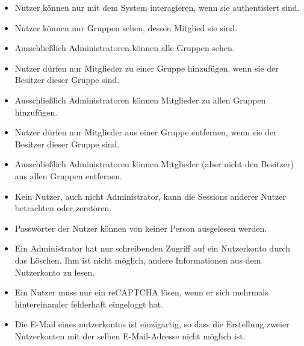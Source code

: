 \documentclass[fontsize=12pt,DIV=14,BCOR=10mm,a4paper,parskip=half-,ngerman,english,bibliography=totocnumbered]{scrreprt}
\begin{document}
\begin{itemize}
  \item Nutzer können nur mit dem System interagieren, wenn sie authentisiert sind.
  \item Nutzer können nur Gruppen sehen, dessen Mitglied sie sind.
  \item Ausschließlich Administratoren können alle Gruppen sehen.
  \item Nutzer dürfen nur Mitglieder zu einer Gruppe hinzufügen, wenn sie der Besitzer dieser Gruppe sind.
  \item Ausschließlich Administratoren können Mitglieder zu allen Gruppen hinzufügen.
  \item Nutzer dürfen nur Mitglieder aus einer Gruppe entfernen, wenn sie der Besitzer dieser Gruppe sind.
  \item Ausschließlich Administratoren können Mitglieder (aber nicht den Besitzer) aus allen Gruppen entfernen.
  \item Kein Nutzer, auch nicht Administrator, kann die Sessions anderer Nutzer betrachten oder zerstören.
  \item Passwörter der Nutzer können von keiner Person ausgelesen werden.
  \item Ein Administrator hat nur schreibenden Zugriff auf ein Nutzerkonto durch das Löschen. Ihm ist nicht möglich, andere Informationen aus dem Nutzerkonto zu lesen.
  \item Ein Nutzer muss nur ein reCAPTCHA lösen, wenn er sich mehrmals hintereinander fehlerhaft eingeloggt hat.
  \item Die E-Mail eines nutzerkontos ist einzigartig, so dass die Erstellung zweier Nutzerkonten mit der selben E-Mail-Adresse nicht möglich ist.
\end{itemize}

\clearpage

\printbibliography

\printacronyms[title=Abkürzungsverzeichnis,toctitle=Abkürzungsverzeichnis]
\printglossary[type=main]

\end{document}
